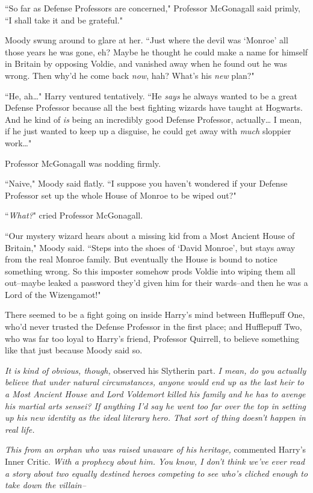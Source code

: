 ``So far as Defense Professors are concerned," Professor McGonagall said primly, ``I shall take it and be grateful."

Moody swung around to glare at her. ``Just where the devil was `Monroe' all those years he was gone, eh? Maybe he thought he could make a name for himself in Britain by opposing Voldie, and vanished away when he found out he was wrong. Then why'd he come back \emph{now}, hah? What's his \emph{new} plan?"

``He, ah{\ldots}" Harry ventured tentatively. ``He \emph{says} he always wanted to be a great Defense Professor because all the best fighting wizards have taught at Hogwarts. And he kind of \emph{is} being an incredibly good Defense Professor, actually{\ldots} I mean, if he just wanted to keep up a disguise, he could get away with \emph{much} sloppier work{\ldots}"

Professor McGonagall was nodding firmly.

``Naive," Moody said flatly. ``I suppose you haven't wondered if your Defense Professor set up the whole House of Monroe to be wiped out?"

``\emph{What?}" cried Professor McGonagall.

``Our mystery wizard hears about a missing kid from a Most Ancient House of Britain," Moody said. ``Steps into the shoes of `David Monroe', but stays away from the real Monroe family. But eventually the House is bound to notice something wrong. So this imposter somehow prods Voldie into wiping them all out\---maybe leaked a password they'd given him for their wards\---and then he was a Lord of the Wizengamot!"

There seemed to be a fight going on inside Harry's mind between Hufflepuff One, who'd never trusted the Defense Professor in the first place; and Hufflepuff Two, who was far too loyal to Harry's friend, Professor Quirrell, to believe something like that just because Moody said so.

\emph{It \emph{is} kind of obvious, though,} observed his Slytherin part. \emph{I mean, do you actually believe that under natural circumstances, anyone would end up as the last heir to a Most Ancient House \emph{and} Lord Voldemort killed his family \emph{and} he has to avenge his martial arts sensei? If anything I'd say he went too far over the top in setting up his new identity as the ideal literary hero. That sort of thing doesn't happen in real life.}

\emph{This from an orphan who was raised unaware of his heritage,} commented Harry's Inner Critic. \emph{With a prophecy about him. You know, I don't think we've ever read a story about two equally destined heroes competing to see who's cliched enough to take down the villain\---}

